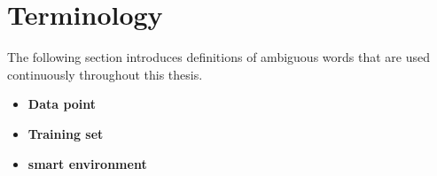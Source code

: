 \section{Terminology}

The following section introduces definitions of ambiguous words that are used continuously throughout this thesis. 

\begin{itemize}

\item \textbf{Data point} 

\item \textbf{Training set} 

\item \textbf{smart environment} 


\end{itemize}
